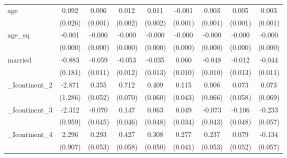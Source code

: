 {\begin{tabular}{l*{8}{c}}
age         &       0.092\sym{***}&       0.006\sym{***}&       0.012\sym{***}&       0.011\sym{***}&      -0.001         &       0.003         &       0.005\sym{***}&       0.003\sym{*}  \\
            &     (0.026)         &     (0.001)         &     (0.002)         &     (0.002)         &     (0.001)         &     (0.001)         &     (0.001)         &     (0.001)         \\
[1em]
age\_sq      &      -0.001\sym{*}  &      -0.000\sym{***}&      -0.000\sym{***}&      -0.000\sym{***}&      -0.000         &      -0.000\sym{***}&      -0.000\sym{***}&      -0.000\sym{*}  \\
            &     (0.000)         &     (0.000)         &     (0.000)         &     (0.000)         &     (0.000)         &     (0.000)         &     (0.000)         &     (0.000)         \\
[1em]
married     &      -0.883\sym{***}&      -0.059\sym{***}&      -0.053\sym{***}&      -0.035\sym{**} &       0.060\sym{***}&      -0.048\sym{***}&      -0.012         &      -0.044\sym{***}\\
            &     (0.181)         &     (0.011)         &     (0.012)         &     (0.013)         &     (0.010)         &     (0.010)         &     (0.013)         &     (0.011)         \\
[1em]
\_Icontinent\_2&      -2.871\sym{*}  &       0.355\sym{***}&       0.712\sym{***}&       0.409\sym{***}&       0.115\sym{**} &       0.006         &       0.073         &       0.073         \\
            &     (1.286)         &     (0.052)         &     (0.070)         &     (0.060)         &     (0.043)         &     (0.066)         &     (0.058)         &     (0.069)         \\
[1em]
\_Icontinent\_3&      -2.312\sym{*}  &      -0.070         &       0.147\sym{**} &       0.063         &       0.049         &      -0.073         &      -0.106\sym{*}  &      -0.233\sym{***}\\
            &     (0.959)         &     (0.045)         &     (0.046)         &     (0.048)         &     (0.034)         &     (0.043)         &     (0.048)         &     (0.057)         \\
[1em]
\_Icontinent\_4&       2.296\sym{*}  &       0.293\sym{***}&       0.427\sym{***}&       0.308\sym{***}&       0.277\sym{***}&       0.237\sym{***}&       0.079         &      -0.134\sym{*}  \\
            &     (0.907)         &     (0.053)         &     (0.058)         &     (0.050)         &     (0.041)         &     (0.053)         &     (0.052)         &     (0.057)         \\

\end{tabular}}
